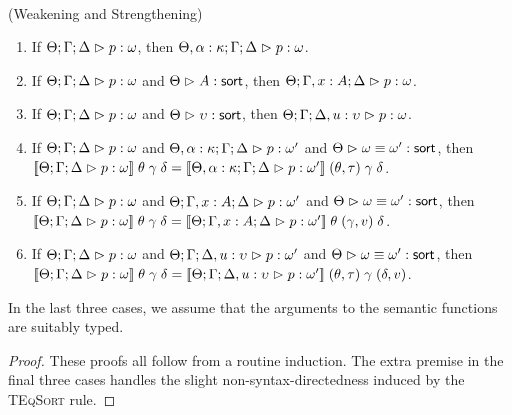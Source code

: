 \ \\

\begin{lemma}{(Weakening and Strengthening)}
\begin{enumerate}
\item If $\judgeA{p}{\omega}$, then $\judgeA[\Theta, \alpha:\kappa; \Gamma; \Delta]{p}{\omega}$.
\item If $\judgeA{p}{\omega}$ and $\judgeSort{A}$, then $\judgeA[\Theta; \Gamma, x:A; \Delta]{p}{\omega}$.
\item If $\judgeA{p}{\omega}$ and $\judgeSort{\upsilon}$, then $\judgeA[\Theta; \Gamma; \Delta, u:\upsilon]{p}{\omega}$.
\item If $\judgeA{p}{\omega}$ and $\judgeA[\Theta, \alpha:\kappa; \Gamma; \Delta]{p}{\omega'}$ and $\judgeSortEq{\omega}{\omega'}$, then \\
      $\interp{\judgeA{p}{\omega}}\;\theta\;\gamma\;\delta =\interp{\judgeA[\Theta, \alpha:\kappa; \Gamma; \Delta]{p}{\omega'}}\;(\theta, \tau)\;\gamma\;\delta$. 
\item If $\judgeA{p}{\omega}$ and $\judgeA[\Theta; \Gamma, x:A; \Delta]{p}{\omega'}$ and $\judgeSortEq{\omega}{\omega'}$, then \\
      $\interp{\judgeA{p}{\omega}}\;\theta\;\gamma\;\delta =\interp{\judgeA[\Theta; \Gamma, x:A; \Delta]{p}{\omega'}}\;\theta\;(\gamma,v)\;\delta$. 
\item If $\judgeA{p}{\omega}$ and $\judgeA[\Theta; \Gamma; \Delta, u:\upsilon]{p}{\omega'}$ and $\judgeSortEq{\omega}{\omega'}$, then \\
      $\interp{\judgeA{p}{\omega}}\;\theta\;\gamma\;\delta =\interp{\judgeA[\Theta; \Gamma; \Delta, u:\upsilon]{p}{\omega'}}\;(\theta, \tau)\;\gamma\;(\delta,v)$. 
\end{enumerate}
In the last three cases, we assume that the arguments to the semantic functions are suitably typed. 
\end{lemma}

\begin{proof}
These proofs all follow from a routine induction. The
extra premise in the final three cases handles the slight non-syntax-directedness induced by the 
\textsc{TEqSort} rule. 
\end{proof}

\ \\

